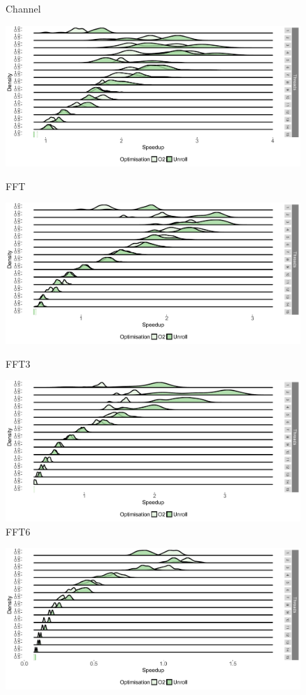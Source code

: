 \begin{appendices}
\begin{figure}[t]
\caption{Channel}\label{chp:stream:ct2}
\end{figure}
\begin{figure}[t]
\center
\includegraphics[width=1\textwidth]{streamit-paper/graphics/appendixgraphs/fft-total2.pdf}
\caption{FFT}\label{chp:stream:ft}
\center
\includegraphics[width=1\textwidth]{streamit-paper/graphics/appendixgraphs/fft3-total2.pdf}
\caption{FFT3}\label{chp:stream:f3t}
\center
\includegraphics[width=1\textwidth]{streamit-paper/graphics/appendixgraphs/fft6-total2.pdf}
\caption{FFT6}\label{chp:stream:f6t}
\end{figure}
\begin{figure}[t]
\center
\includegraphics[width=1\textwidth]{streamit-paper/graphics/appendixgraphs/fir-total2.pdf}

\end{figure}
\end{appendices}
